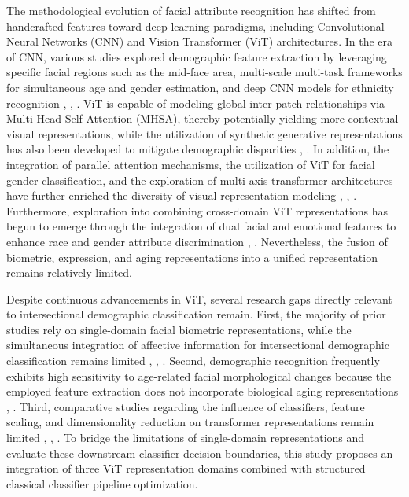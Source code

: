 The methodological evolution of facial attribute recognition has shifted from handcrafted features toward deep learning paradigms, including Convolutional Neural Networks (CNN) and Vision Transformer (ViT) architectures. In the era of CNN, various studies explored demographic feature extraction by leveraging specific facial regions such as the mid-face area, multi-scale multi-task frameworks for simultaneous age and gender estimation, and deep CNN models for ethnicity recognition \cite{ref11}, \cite{ref12}, \cite{ref13}. ViT is capable of modeling global inter-patch relationships via Multi-Head Self-Attention (MHSA), thereby potentially yielding more contextual visual representations, while the utilization of synthetic generative representations has also been developed to mitigate demographic disparities \cite{ref14}, \cite{ref15}. In addition, the integration of parallel attention mechanisms, the utilization of ViT for facial gender classification, and the exploration of multi-axis transformer architectures have further enriched the diversity of visual representation modeling \cite{ref16}, \cite{ref17}, \cite{ref18}. Furthermore, exploration into combining cross-domain ViT representations has begun to emerge through the integration of dual facial and emotional features to enhance race and gender attribute discrimination \cite{ref19}, \cite{ref20}. Nevertheless, the fusion of biometric, expression, and aging representations into a unified representation remains relatively limited.

Despite continuous advancements in ViT, several research gaps directly relevant to intersectional demographic classification remain. First, the majority of prior studies rely on single-domain facial biometric representations, while the simultaneous integration of affective information for intersectional demographic classification remains limited \cite{ref11}, \cite{ref17}, \cite{ref18}. Second, demographic recognition frequently exhibits high sensitivity to age-related facial morphological changes because the employed feature extraction does not incorporate biological aging representations \cite{ref12}, \cite{ref17}. Third, comparative studies regarding the influence of classifiers, feature scaling, and dimensionality reduction on transformer representations remain limited \cite{ref13}, \cite{ref19}, \cite{ref20}. To bridge the limitations of single-domain representations and evaluate these downstream classifier decision boundaries, this study proposes an integration of three ViT representation domains combined with structured classical classifier pipeline optimization.

